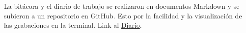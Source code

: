 La bitácora y el diario de trabajo se realizaron en documentos Markdown y se subieron a un repositorio en GitHub. Esto por la facilidad y la visualización de las grabaciones en la terminal. Link al \href{https://github.com/DSarceno/2022LabSimu201900109/blob/main/Practicas/Diario.md}{Diario}.